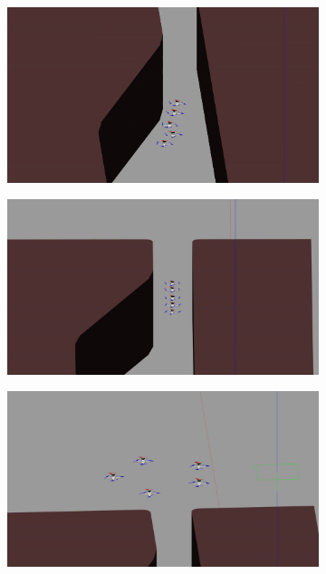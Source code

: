 \begin{figure}[h!]
\begin{subfigure}[b]{0.325\textwidth}
    \caption{}
    \end{subfigure}
    \begin{subfigure}[b]{0.325\textwidth}
    \includegraphics[width=\textwidth]{paper3/images/gazebo_04.png}
    \caption{}
    \end{subfigure}
    \begin{subfigure}[b]{0.325\textwidth}
    \includegraphics[width=\textwidth]{paper3/images/gazebo_05.png}
    \caption{}
    \end{subfigure}
    \begin{subfigure}[b]{0.325\textwidth}
    \includegraphics[width=\textwidth]{paper3/images/gazebo_06.png}

\end{subfigure}
\end{figure}
